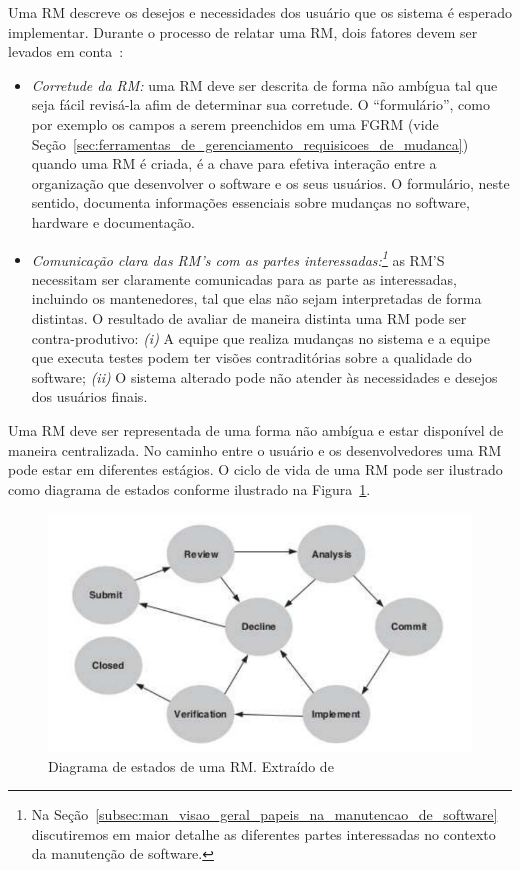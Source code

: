 Uma RM descreve os desejos e
necessidades dos usuário que os sistema é esperado implementar. Durante o
processo de relatar uma RM, dois fatores devem ser levados em
conta~\cite{tripathy2014software}:

\begin{itemize}
	\item \textit{Corretude da RM:} uma RM deve ser descrita de forma não ambígua tal
		que seja fácil revisá-la afim de determinar sua corretude. O
		``formulário'', como por exemplo os campos a serem preenchidos em uma
		FGRM (vide
		Seção~\ref{sec:ferramentas_de_gerenciamento_requisicoes_de_mudanca})
		quando uma RM é criada, é a chave para efetiva interação entre a
		organização que desenvolver o software e os seus usuários. O formulário,
		neste sentido, documenta informações essenciais sobre mudanças no
		software, hardware e documentação.
   \item \textit{Comunicação clara das RM's com as partes
		   interessadas:\footnote{Na
			   Seção~\ref{subsec:man_visao_geral_papeis_na_manutencao_de_software}
			   discutiremos em maior detalhe as diferentes partes interessadas
			   no contexto da manutenção de software.}} as RM'S necessitam ser
	   claramente comunicadas para as parte as interessadas, incluindo os
	   mantenedores, tal que elas não sejam interpretadas de forma distintas. O
	   resultado de avaliar de maneira distinta uma RM pode ser contra-produtivo:
	   \textit{(i)} A equipe que realiza mudanças no sistema e a equipe que
	   executa testes podem ter  visões contraditórias sobre a qualidade do
	   software; \textit{(ii)} O sistema alterado pode não atender às
	   necessidades e desejos dos usuários finais.
\end{itemize}

Uma RM deve ser representada de uma forma não ambígua e estar disponível de
maneira centralizada. No caminho entre o usuário e os desenvolvedores uma RM
pode estar em diferentes estágios. O ciclo de vida de uma RM pode ser ilustrado
como diagrama de estados conforme ilustrado na
Figura~\ref{fig:diagrama-estado-rm}.

\begin{figure}[htpb]
	\centering
	\includegraphics[width=0.8\linewidth]{./chapter-manutencao-software-visao-geral/img/diagrama-estado-rm.pdf}
	\caption{Diagrama de estados de uma RM\@. Extraído
		de~\cite{tripathy2014software}}
\label{fig:diagrama-estado-rm}
\end{figure}


